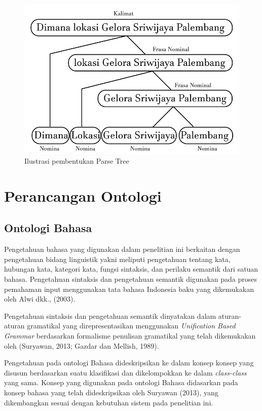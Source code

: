	\begin{figure}[H]
		\centering
		\includegraphics[scale=0.45]{gambar/parsetree.png}
		\caption{Ilustrasi pembentukan Parse Tree}
		\label{fig:parsetree}
	\end{figure}
	
	\section{Perancangan Ontologi}
	
	\subsection{Ontologi Bahasa}
	Pengetahuan bahasa yang digunakan dalam penelitian ini berkaitan dengan pengetahuan bidang linguistik yakni meliputi pengetahuan tentang kata, hubungan kata, kategori kata, fungsi sintaksis, dan perilaku semantik dari satuan bahasa. Pengetahuan sintaksis dan pengetahuan semantik digunakan pada proses pemahaman input menggunakan tata bahasa Indonesia baku yang dikemukakan oleh Alwi dkk., (2003).
	
	Pengetahuan sintaksis dan pengetahuan semantik dinyatakan dalam aturan-aturan gramatikal yang direpresentasikan menggunakan \emph{Unification Based Grammar} berdasarkan formalisme penulisan gramatikal yang telah dikemukakan oleh (Suryawan, 2013; Gazdar dan Mellish, 1989). 
	
	Pengetahuan pada ontologi Bahasa dideskripsikan ke dalam konsep konsep yang disusun berdasarkan suatu klasifikasi dan dikelompokkan ke dalam \emph{class-class} yang sama. Konsep yang digunakan pada ontologi Bahasa didasarkan pada konsep bahasa yang telah dideskripsikan oleh Suryawan (2013), yang dikembangkan sesuai dengan kebutuhan sistem pada penelitian ini.
	
